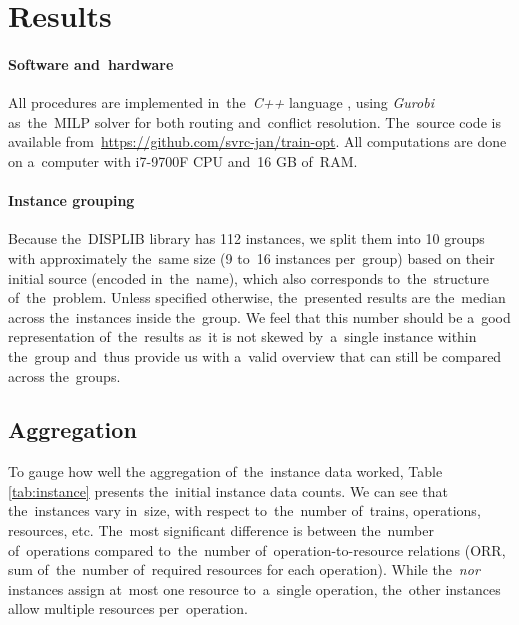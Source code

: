 \chapter{Results}
\label{chap:results}

\subsubsection{Software and~hardware}
All procedures are implemented in~the~\emph{C++} language \cite{cpp23}, using \emph{Gurobi} \cite{gurobi} as~the~MILP solver for both routing and~conflict resolution. The~source code is available from~\url{https://github.com/svrc-jan/train-opt}. All computations are done on a~computer with 
i7-9700F CPU and~16 GB of~RAM. 

\subsubsection{Instance grouping}
Because the~DISPLIB library has 112 instances, we split them into 10 groups with approximately the~same size (9 to~16 instances per~group) based on their initial source (encoded in~the~name), which also corresponds to~the~structure of~the~problem. Unless specified otherwise, the~presented results are the~median across the~instances inside the~group. We feel that this number should be a~good representation of~the~results as~it is not skewed by~a~single instance within the~group and~thus provide us with a~valid overview that can still be compared across the~groups.	

\section{Aggregation}
To gauge how well the aggregation of~the~instance data worked, Table \ref{tab:instance} presents the~initial instance data counts. We can see that the~instances vary in~size, with respect to~the~number of~trains, operations, resources, etc. The~most significant difference is between the~number of~operations compared to~the~number of~operation-to-resource relations (ORR, sum of~the~number of~required resources for each operation). While the~\emph{nor} instances assign at~most one resource to~a~single operation, the~other instances allow multiple resources per~operation.

\begin{table}[htbp!]
\begin{center}
\caption{Initial instance data}
\label{tab:instance}

\end{center}
\end{table}

